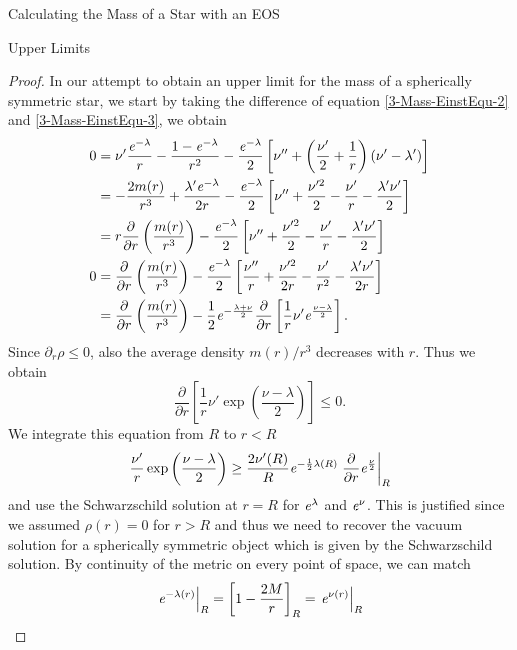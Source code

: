 \begin{section}{Calculating the Mass of a Star with an EOS}
\begin{subsection}{Upper Limits}
\begin{theorem}
\end{theorem}
\begin{proof}
	In our attempt to obtain an upper limit for the mass of a spherically symmetric star, we start by taking the difference of equation \eqref{3-Mass-EinstEqu-2} and \eqref{3-Mass-EinstEqu-3}, we obtain 
	\begin{align}
		0 &= \nu'\frac{\mathit{e}^{-\lambda}}{r} - \frac{1-\mathit{e}^{-\lambda}}{r^2} - \frac{\mathit{e}^{-\lambda}}{2}\left[\nu''+\left(\frac{\nu'}{2} + \frac{1}{r}\right)\left(\nu'-\lambda'\right) \right]\\
		&= - \frac{2m(r)}{r^3} + \frac{\lambda'\mathit{e}^{-\lambda}}{2r} -  \frac{\mathit{e}^{-\lambda}}{2}\left[\nu''+ \frac{\nu'^2}{2} - \frac{\nu'}{r} -\frac{\lambda'\nu'}{2}\right]\\
		&= r\frac{\partial}{\partial r}\left(\frac{m(r)}{r^3}\right) - \frac{\mathit{e}^{-\lambda}}{2}\left[\nu''+ \frac{\nu'^2}{2} - \frac{\nu'}{r} -\frac{\lambda'\nu'}{2}\right]\\
		0 &= \frac{\partial}{\partial r}\left(\frac{m(r)}{r^3}\right) - \frac{\mathit{e}^{-\lambda}}{2}\left[\frac{\nu''}{r}+ \frac{\nu'^2}{2r} - \frac{\nu'}{r^2} -\frac{\lambda'\nu'}{2r}\right]\\
		&= \frac{\partial}{\partial r}\left(\frac{m(r)}{r^3}\right) - \frac{1}{2}\mathit{e}^{-\frac{\lambda+\nu}{2}}\frac{\partial}{\partial r}\left[\frac{1}{r}\nu'\mathit{e}^{\frac{\nu-\lambda}{2}}\right].
	\end{align}
	Since $\partial_r\rho\leq0$, also the average density $m(r)/r^3$ decreases with $r$. Thus we obtain
	\begin{equation}
		\frac{\partial}{\partial r}\left[\frac{1}{r}\nu'\exp\left(\frac{\nu-\lambda}{2}\right) \right] \leq 0.
	\end{equation}
	We integrate this equation from $R$ to $r<R$
	\begin{equation}
		\frac{\nu'}{r}\exp\left(\frac{\nu-\lambda}{2}\right)\geq\frac{2\nu'(R)}{R}\mathit{e}^{-\frac{1}{2}\lambda(R)}\left.\frac{\partial}{\partial r}\mathit{e}^{\frac{\nu}{2}}\right|_R
	\end{equation}
	and use the Schwarzschild solution at $r=R$ for $\mathit{e}^\lambda$ and $\mathit{e}^\nu$. This is justified since we assumed $\rho(r)=0$ for $r>R$ and thus we need to recover the vacuum solution for a spherically symmetric object which is given by the Schwarzschild solution. By continuity of the metric on every point of space, we can match 
	\begin{equation}
		\left.\e^{-\lambda(r)}\right|_R=\left[1-\frac{2M}{r}\right]_R=\left.\e^{\nu(r)}\right|_R
		\label{3-Mass-MassLimitApprox1}

\end{equation}
\end{proof}
\end{subsection}
\end{section}

